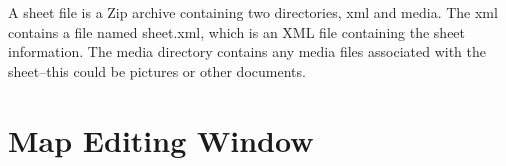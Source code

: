 A sheet file is a Zip archive containing two directories, xml and media.
The xml contains a file named sheet.xml, which is an XML file containing
the sheet information.  The media directory contains any media files
associated with the sheet--this could be pictures or other documents.

\section{Map Editing Window}
\label{Map}


